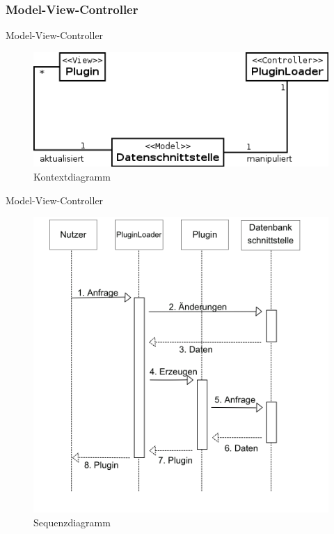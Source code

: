 \documentclass{beamer}
\begin{document}
		\subsubsection[MVC]{Model-View-Controller}
		\begin{frame}{Model-View-Controller}
			\begin{figure}
				\centering
				\includegraphics[width=0.7\linewidth]{../Grafik/Diagramm/Pattern/MVC/Kontextdiagramm}
				\caption{Kontextdiagramm}
				\label{fig:Kontext5}
			\end{figure}
		\end{frame}
		\begin{frame}{Model-View-Controller}	
			\begin{figure}
				\centering
				\includegraphics[height=0.8\textheight]{../Grafik/Diagramm/Pattern/MVC/Sequenzdiagramm}
				\caption{Sequenzdiagramm}
				\label{fig:Sequenz5}
			\end{figure}
		\end{frame}
		
\end{document}
